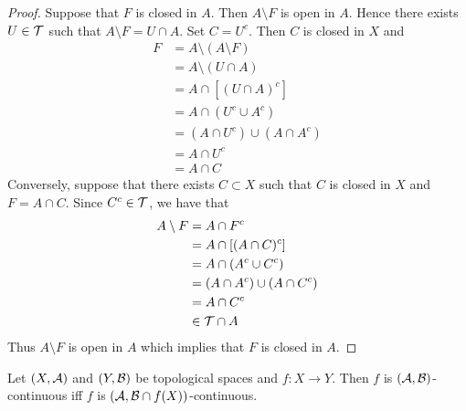\documentclass{book}
\begin{document}
\begin{proof}
	Suppose that $F$ is closed in $A$. Then $A \setminus F$ is open in $A$. Hence there exists $U \in \mathcal{T}$ such that $A \setminus F = U \cap A$. Set $C = U^c$. Then $C$ is closed in $X$ and  
	\begin{align*}
		F
		& = A \setminus (A \setminus F) \\
		& = A \setminus (U \cap A) \\
		& = A \cap [(U \cap A)^c] \\
		& = A \cap (U^c \cup A^c) \\
		& = (A \cap U^c) \cup (A \cap A^c) \\
		& = A \cap U^c \\
		& = A \cap C
	\end{align*}
Conversely, suppose that there exists $C \subset X$ such that $C$ is closed in $X$ and $F = A \cap C$. Since $C^c \in \mathcal{T}$, we have that  
\begin{align*}
	A \setminus F
	& = A \cap F^c \\
	& = A \cap [(A \cap C)^c] \\
	& = A \cap (A^c \cup C^c) \\
	& = (A \cap A^c) \cup (A \cap C^c) \\
	& = A \cap C^c \\
	& \in \mathcal{T} \cap A
\end{align*}
Thus $A \setminus F$ is open in $A$ which implies that $F$ is closed in $A$.
\end{proof}

\begin{ex} 
	Let $(X, \mathcal{A})$ and $(Y, \mathcal{B})$ be topological spaces and $f:X \rightarrow Y$. Then $f$ is $(\mathcal{A}, \mathcal{B})$-continuous iff $f$ is $(\mathcal{A}, \mathcal{B} \cap f(X))$-continuous.
\end{ex}
\end{document}
